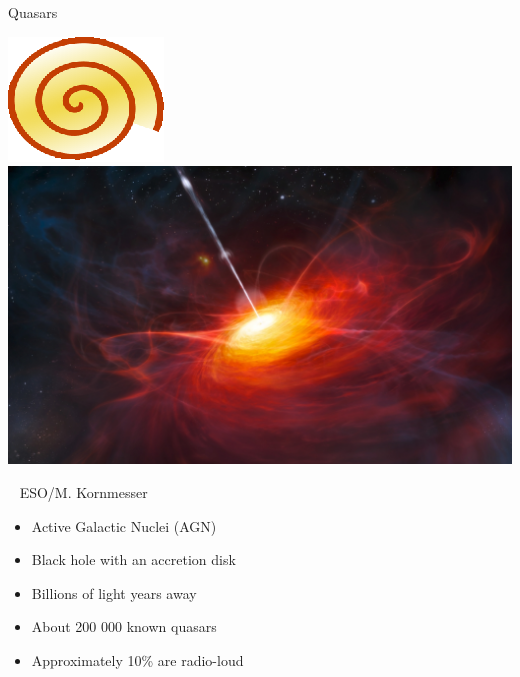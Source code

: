 \documentclass[14pt,table,t, c]{beamer}
\begin{document}
\begin{frame}{Quasars}
\begin{minipage}[t][][c]{0.48\linewidth}
    \includegraphics[width=0.7\linewidth]{figure/quasar2} \\
    \vspace*{1em}
    \includegraphics[width=\linewidth]{figure/quasar.jpg}

    \tiny{\hfill\textcopyright~ ESO/M. Kornmesser}
\end{minipage}\hfill
\begin{minipage}[t][][c]{0.5\linewidth}
\begin{itemize}
  \item Active Galactic Nuclei (AGN)
  \item Black hole with an accretion disk
  \item Billions of light years away
  \item About 200 000 known quasars
  \item Approximately 10\% are radio-loud
  \end{itemize}
\end{minipage}
\end{frame}
\end{document}
